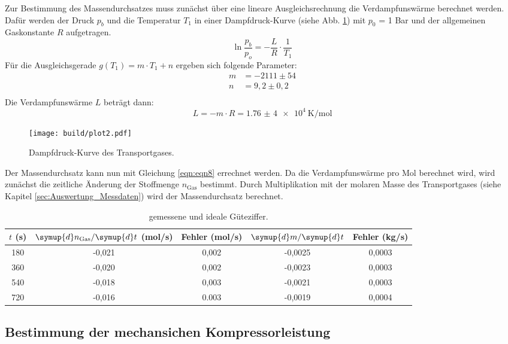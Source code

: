 Zur Bestimmung des Massendurchsatzes muss zunächst über eine lineare Ausgleichsrechnung die Verdampfunswärme berechnet werden.
Dafür werden der Druck $p_b$ und die Temperatur $T_1$ in einer Dampfdruck-Kurve (siehe Abb. \ref{fig:plot2}) mit $p_0$ = 1 Bar und der allgemeinen Gaskonstante $R$ aufgetragen.
\begin{equation*}
  \ln{\frac{p_b}{p_o}} = - \frac{L}{R} \cdot \frac{1}{T_1}
\end{equation*}
Für die Ausgleichsgerade $g(T_1) = m \cdot T_1 + n$ ergeben sich folgende Parameter:
\begin{align*}
  m &= -2111 \pm 54 \\
  n &= 9,2 \pm 0,2 \\
\end{align*}
Die Verdampfunswärme $L$ beträgt dann:
\begin{equation*}
  L = - m \cdot R = \SI{1,76(4)e4}{\kelvin\per\mol}
\end{equation*}
\begin{figure}
  \centering
  \texttt{[image: build/plot2.pdf]}
  \caption{Dampfdruck-Kurve des Transportgases.}
  \label{fig:plot2}
\end{figure}
\FloatBarrier
Der Massendurchsatz kann nun mit Gleichung \eqref{eqn:eqn8} errechnet werden.
Da die Verdampfunswärme pro Mol berechnet wird, wird zunächst die zeitliche Änderung der Stoffmenge $n_{\text{Gas}}$ bestimmt.
Durch Multiplikation mit der molaren Masse des Transportgases (siehe Kapitel \ref{sec:Auswertung_Messdaten}) wird der Massendurchsatz berechnet.
\begin{table}
  \centering
  \caption{gemessene und ideale Güteziffer.}
  \label{tab:guete}
  \begin{tabular}{c c c c c}
    \toprule
    $t$ (s) & $\symup{d}n_{\text{Gas}}/\symup{d}t$ (mol/s) & Fehler (mol/s) & $\symup{d}m/\symup{d}t$ & Fehler (kg/s)  \\
    \midrule
    180 & -0,021 & 0,002 & -0,0025 & 0,0003 \\
    360 & -0,020 & 0,002 & -0,0023 & 0,0003 \\
    540 & -0,018 & 0,003 & -0,0021 & 0,0003 \\
    720 & -0,016 & 0.003 & -0,0019 & 0,0004 \\
    \bottomrule
  \end{tabular}
\end{table}

\subsection{Bestimmung der mechansichen Kompressorleistung}
\label{sec:Auswertung_Leistung}

